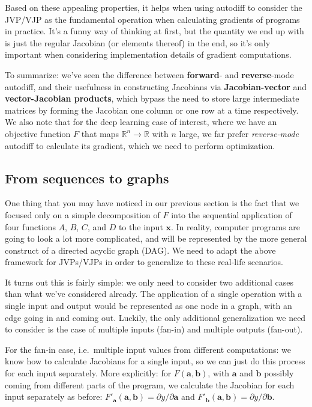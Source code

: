 \documentclass[
  11pt,
  numbers=noendperiod]{book}
\begin{document}
Based on these appealing properties, it helps when using autodiff to
consider the JVP/VJP as the fundamental operation when calculating
gradients of programs in practice. It's a funny way of thinking at
first, but the quantity we end up with is just the regular Jacobian (or
elements thereof) in the end, so it's only important when considering
implementation details of gradient computations.

To summarize: we've seen the difference between \textbf{forward}- and
\textbf{reverse}-mode autodiff, and their usefulness in constructing
Jacobians via \textbf{Jacobian-vector} and \textbf{vector-Jacobian
products}, which bypass the need to store large intermediate matrices
by forming the Jacobian one column or one row at a time respectively. We
also note that for the deep learning case of interest, where we have an
objective function \(F\) that maps
\(\mathbb{R}^n \rightarrow \mathbb{R}\) with \(n\) large, we far prefer
\emph{reverse-mode} autodiff to calculate its gradient, which we need to
perform optimization.

\hypertarget{from-sequences-to-graphs}{%
\subsection{From sequences to graphs}\label{from-sequences-to-graphs}}

One thing that you may have noticed in our previous section is the fact
that we focused only on a simple decomposition of \(F\) into the
sequential application of four functions \(A\), \(B\), \(C\), and \(D\)
to the input \(\mathbf{x}\). In reality, computer programs are going to
look a lot more complicated, and will be represented by the more general
construct of a directed acyclic graph (DAG). We need to adapt the above
framework for JVPs/VJPs in order to generalize to these real-life
scenarios.

It turns out this is fairly simple: we only need to consider two
additional cases than what we've considered already. The application of
a single operation with a single input and output would be represented
as one node in a graph, with an edge going in and coming out. Luckily,
the only additional generalization we need to consider is the case of
multiple inputs (fan-in) and multiple outputs (fan-out).

For the fan-in case, i.e.~multiple input values from different
computations: we know how to calculate Jacobians for a single input, so
we can just do this process for each input separately. More explicitly:
for \(F(\mathbf{a}, \mathbf{b})\), with \(\mathbf{a}\) and
\(\mathbf{b}\) possibly coming from different parts of the program, we
calculate the Jacobian for each input separately as before:
\(F'_\mathbf{a}(\mathbf{a}, \mathbf{b}) = \partial y / \partial \mathbf{a}\)
and
\(F'_\mathbf{b}(\mathbf{a}, \mathbf{b}) = \partial y /\partial \mathbf{b}\).
\end{document}
